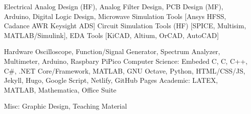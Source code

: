 

\begin{cvskills}

  \cvskill
    {Electrical} %
    {Analog Design (HF), Analog Filter Design, PCB Design (MF), Arduino, Digital Logic Design, Microwave Simulation Tools [Ansys HFSS, Cadance AWR Keysight ADS] Circuit Simulation Tools (HF) [SPICE, Multisim, MATLAB/Simulink], EDA Tools [KiCAD, Altium, OrCAD, AutoCAD]} %

\cvskill
    {Hardware}
    {Oscilloscope, Function/Signal Generator, Spectrum Analyzer, Multimeter, Arduino, Raspbary PiPico }
  \cvskill
    {Computer Science:} %
    {Embeded C, C, C++, C\#, .NET Core/Framework, MATLAB, GNU Octave, Python, HTML/CSS/JS, Jekyll, Hugo, Google Script, Netlify, GitHub Pages} %
  \cvskill
    {Academic:} %
    {LATEX, MATLAB, Mathematica, Office Suite} %


  \cvskill
    {Misc:} %
    {Graphic Design, Teaching Material} %
\end{cvskills}